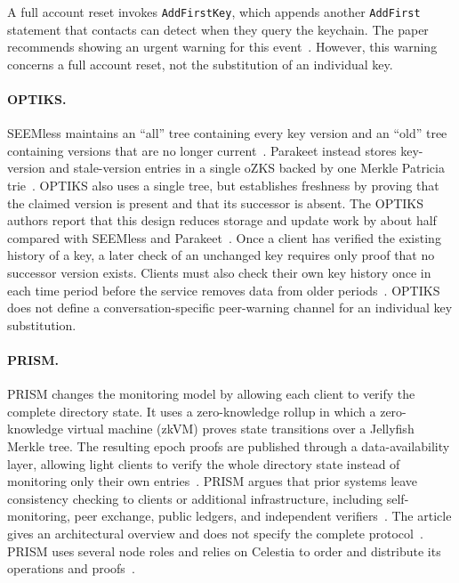 A full account reset invokes \texttt{AddFirstKey}, which appends another \texttt{AddFirst}
statement that contacts can detect when they query the keychain. The paper recommends showing an
urgent warning for this event~\cite[Section~2.2]{len2023elektra}. However, this warning concerns a
full account reset, not the substitution of an individual key.

\paragraph{OPTIKS.}
SEEMless maintains an ``all'' tree containing every key version and an ``old'' tree containing
versions that are no longer current~\cite[Section~4]{chase2019seemless}. Parakeet instead stores
key-version and stale-version entries in a single oZKS backed by one Merkle Patricia
trie~\cite[Sections~III-C--III-D]{malvai2023parakeet}. OPTIKS also uses a single tree, but
establishes freshness by proving that the claimed version is present and that its successor is
absent. The OPTIKS authors report that this design reduces storage and update work by about half
compared with SEEMless and Parakeet~\cite{optiks2024}. Once a client has verified the existing history of a key, a later check of an
unchanged key requires only proof that no successor version exists. Clients must
also check their own key history once in each time period before the service removes
data from older periods~\cite[Section~5]{optiks2024}. OPTIKS does not
define a conversation-specific peer-warning channel for an individual key substitution.

\paragraph{PRISM.}
PRISM changes the monitoring model by allowing each client to verify the complete directory state.
It uses a zero-knowledge rollup in which a zero-knowledge virtual machine (zkVM) proves state
transitions over a Jellyfish Merkle tree. The resulting epoch proofs are published through a
data-availability layer, allowing light clients to verify the whole directory state instead of
monitoring only their own entries~\cite[Sections~1 and~4]{pusch2025prism}. PRISM argues that prior
systems leave consistency checking to clients or additional infrastructure, including
self-monitoring, peer exchange, public ledgers, and independent verifiers~\cite{pusch2025prism}. The
article gives an architectural overview and does not specify the complete
protocol~\cite{pusch2025prism}. PRISM uses several node roles and relies on Celestia to order and
distribute its operations and proofs~\cite[Sections~3.2 and~4]{pusch2025prism}.

